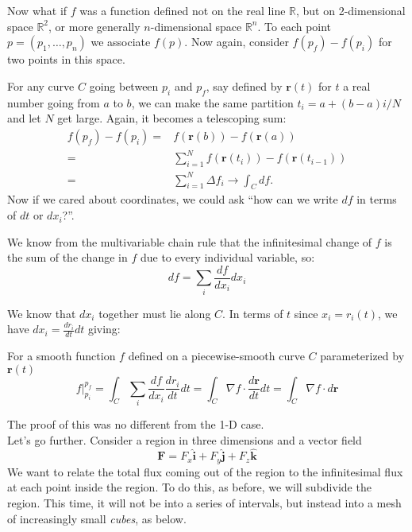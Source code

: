 	
	Now what if $f$ was a function defined not on the real line $\mathbb{R}$, but on 2-dimensional space $\mathbb{R}^2$, or more generally $n$-dimensional space $\mathbb{R}^n$. To each point $p = (p_1, \dots, p_n)$ we associate $f(p)$. Now again, consider $f(p_f)-f(p_i)$ for two points in this space.
	
	For any curve $C$ going between $p_i$ and $p_f$, say defined by $\mathbf r(t)$ for $t$ a real number going from $a$ to $b$, we can make the same partition $t_i = a + (b-a)i/N$ and let $N$ get large. Again, it becomes a telescoping sum:
	\begin{align*}
		f(p_f) - f(p_i) = &f(\mathbf r(b)) - f(\mathbf r(a)) \\= & \sum_{i=1}^N f(\mathbf r(t_{i}))-f(\mathbf r(t_{i-1})) \\ = & \sum_{i=1}^N \Delta f_i  \rightarrow \int_C df.
	\end{align*}
	Now if we cared about coordinates, we could ask ``how can we write $df$ in terms of $dt$ or $dx_i$?''. 
	
	We know from the multivariable chain rule that the infinitesimal change of $f$ is the sum of the change in $f$ due to every individual variable, so: 
	\begin{equation}
		df = \sum_i \frac{df}{dx_i} dx_i
	\end{equation}

	We know that $dx_i$ together must lie along $C$. In terms of $t$ since $x_i = r_i (t)$, we have $dx_i = \frac{dr_i}{dt} dt$ giving:
	\begin{theorem}
	For a smooth function $f$ defined on a piecewise-smooth curve $C$ parameterized by $\mathbf r(t)$
		\begin{equation}
			f\rvert^{p_f}_{p_i} = \int_C \sum_i \frac{df}{dx_i} \frac{dr_i}{dt} dt = \int_C \nabla f \cdot \frac{d \mathbf r}{dt} dt =  \int_C \nabla f \cdot d \mathbf r
		\end{equation}
	\end{theorem}
	The proof of this was no different from the 1-D case.\\
	
	Let's go further. Consider a region in three dimensions and a vector field 
	\begin{equation*}
		\mathbf F = F_x \hat{\mathbf{i}} + F_y \hat{\mathbf j} + F_z \hat{\mathbf k}
	\end{equation*} 
	We want to relate the total flux coming out of the region to the infinitesimal flux at each point inside the region. To do this, as before, we will subdivide the region. This time, it will not be into a series of intervals, but instead into a mesh of increasingly small \emph{cubes}, as below.
	
